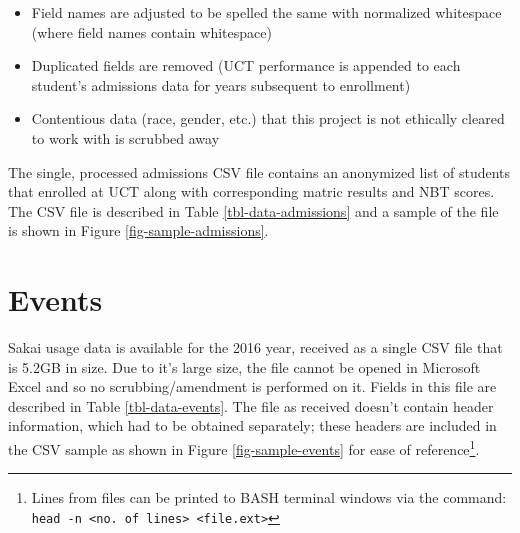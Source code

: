\begin{itemize}
    \item Field names are adjusted to be spelled the same with normalized whitespace (where field names contain whitespace)
    \item Duplicated fields are removed (UCT performance is appended to each student's admissions data for years subsequent to enrollment)
    \item Contentious data (race, gender, etc.) that this project is not ethically cleared to work with is scrubbed away
\end{itemize}

The single, processed admissions CSV file contains an anonymized list of students that enrolled at UCT along with corresponding matric results and NBT scores. The CSV file is described in Table \ref{tbl-data-admissions} and a sample of the file is shown in Figure \ref{fig-sample-admissions}.

\section{Events}
Sakai usage data is available for the 2016 year, received as a single CSV file that is 5.2GB in size. Due to it's large size, the file cannot be opened in Microsoft Excel and so no scrubbing/amendment is performed on it. Fields in this file are described in Table \ref{tbl-data-events}. The file as received doesn't contain header information, which had to be obtained separately; these headers are included in the CSV sample as shown in Figure \ref{fig-sample-events} for ease of reference\footnote{Lines from files can be printed to BASH terminal windows via the command: \texttt{head -n <no. of lines> <file.ext>}}.





